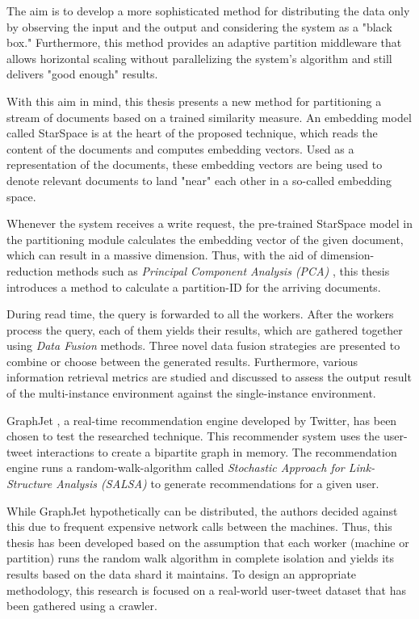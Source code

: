 The aim is to develop a more sophisticated method for distributing the data only by observing the input and the output and considering the system as a "black box." Furthermore, this method provides an adaptive partition middleware that allows horizontal scaling without parallelizing the system's algorithm and still delivers "good enough" results. 


With this aim in mind, this thesis presents a new method for partitioning a stream of documents based on a trained similarity measure. An embedding model called StarSpace \cite{wuStarSpaceEmbedAll2017} is at the heart of the proposed technique, which reads the content of the documents and computes embedding vectors. Used as a representation of the documents, these embedding vectors are being used to denote relevant documents to land "near" each other in a so-called embedding space. 


Whenever the system receives a write request, the pre-trained StarSpace model in the partitioning module calculates the embedding vector of the given document, which can result in a massive dimension. Thus, with the aid of dimension-reduction methods such as \emph{Principal Component Analysis (PCA)} \cite{woldPrincipalComponentAnalysis1987}, this thesis introduces a method to calculate a partition-ID for the arriving documents. 


During read time, the query is forwarded to all the workers. After the workers process the query, each of them yields their results, which are gathered together using \emph{Data Fusion} methods. Three novel data fusion strategies are presented to combine or choose between the generated results. Furthermore, various information retrieval metrics are studied and discussed to assess the output result of the multi-instance environment against the single-instance environment.


GraphJet \cite{sharmaGraphJetRealtimeContent2016}, a real-time recommendation engine developed by Twitter, has been chosen to test the researched technique. This recommender system uses the user-tweet interactions to create a bipartite graph in memory. The recommendation engine runs a random-walk-algorithm called \emph{Stochastic Approach for Link-Structure Analysis (SALSA)} \cite{lempelSALSAStochasticApproach2001} to generate recommendations for a given user. 


While GraphJet hypothetically can be distributed, the authors decided against this due to frequent expensive network calls between the machines. Thus, this thesis has been developed based on the assumption that each worker (machine or partition) runs the random walk algorithm in complete isolation and yields its results based on the data shard it maintains. To design an appropriate methodology, this research is focused on a real-world user-tweet dataset that has been gathered using a crawler. 


